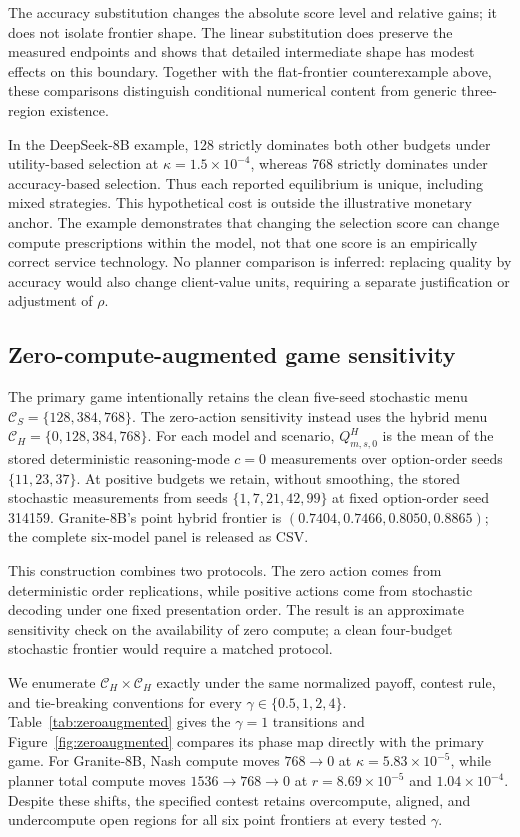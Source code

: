 \documentclass{article}
\begin{document}
The accuracy substitution changes the absolute score level and relative gains; it does not isolate frontier shape. The linear substitution does preserve the measured endpoints and shows that detailed intermediate shape has modest effects on this boundary. Together with the flat-frontier counterexample above, these comparisons distinguish conditional numerical content from generic three-region existence.

In the DeepSeek-8B example, 128 strictly dominates both other budgets under utility-based selection at $\kappa=1.5\times10^{-4}$, whereas 768 strictly dominates under accuracy-based selection. Thus each reported equilibrium is unique, including mixed strategies. This hypothetical cost is outside the illustrative monetary anchor. The example demonstrates that changing the selection score can change compute prescriptions within the model, not that one score is an empirically correct service technology. No planner comparison is inferred: replacing quality by accuracy would also change client-value units, requiring a separate justification or adjustment of $\rho$.


\subsection{Zero-compute-augmented game sensitivity}
\label{app:zeroaugmented}

The primary game intentionally retains the clean five-seed stochastic menu $\mathcal C_S=\{128,384,768\}$. The zero-action sensitivity instead uses the hybrid menu $\mathcal C_H=\{0,128,384,768\}$. For each model and scenario, $Q^H_{m,s,0}$ is the mean of the stored deterministic reasoning-mode $c=0$ measurements over option-order seeds $\{11,23,37\}$. At positive budgets we retain, without smoothing, the stored stochastic measurements from seeds $\{1,7,21,42,99\}$ at fixed option-order seed 314159. Granite-8B's point hybrid frontier is $(0.7404,0.7466,0.8050,0.8865)$; the complete six-model panel is released as CSV.

This construction combines two protocols. The zero action comes from deterministic order replications, while positive actions come from stochastic decoding under one fixed presentation order. The result is an approximate sensitivity check on the availability of zero compute; a clean four-budget stochastic frontier would require a matched protocol.

We enumerate $\mathcal C_H\times\mathcal C_H$ exactly under the same normalized payoff, contest rule, and tie-breaking conventions for every $\gamma\in\{0.5,1,2,4\}$. Table~\ref{tab:zeroaugmented} gives the $\gamma=1$ transitions and Figure~\ref{fig:zeroaugmented} compares its phase map directly with the primary game. For Granite-8B, Nash compute moves $768\to0$ at $\kappa=5.83\times10^{-5}$, while planner total compute moves $1536\to768\to0$ at $r=8.69\times10^{-5}$ and $1.04\times10^{-4}$. Despite these shifts, the specified contest retains overcompute, aligned, and undercompute open regions for all six point frontiers at every tested $\gamma$.
\end{document}

